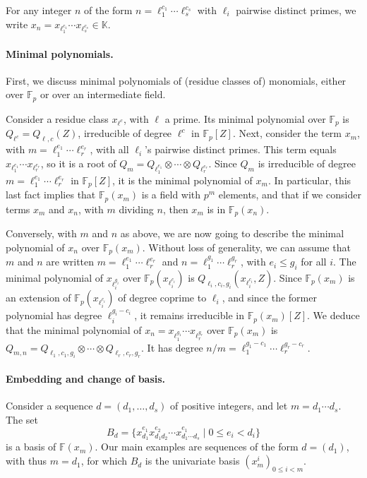 \documentclass[12pt]{article}
\def\F {\ensuremath{\mathbb{F}}}
\def\K {\ensuremath{\mathbb{K}}}
\begin{document}
For any integer $n$ of the form $n=\ell_1^{c_1}\cdots \ell_s^{c_s}$
with $\ell_i$ pairwise distinct primes, we write $x_n =
x_{\ell_1^{c_1}} \cdots x_{\ell_s^{c_s}} \in \K$.



\paragraph{Minimal polynomials.}
First, we discuss minimal polynomials of (residue classes of)
monomials, either over $\F_p$ or over an intermediate field.

Consider a residue class $x_{\ell^{c}}$, with $\ell$ a prime. Its
minimal polynomial over $\F_p$ is $Q_{\ell^c}=Q_{\ell,c}(Z)$,
irreducible of degree $\ell^{c}$ in $\F_p[Z]$. Next, consider the term
$x_m$, with $m=\ell_1^{e_1}\cdots \ell_r^{e_r}$, with all $\ell_i$'s
pairwise distinct primes. This term equals $x_{\ell_1^{e_1}} \cdots
x_{\ell_r^{e_r}}$, so it is a root of $Q_{m}=Q_{\ell_1^{e_1}} \otimes
\cdots \otimes Q_{\ell_r^{e_r}}.$ Since $Q_m$ is irreducible of degree
$m=\ell_1^{e_1}\cdots \ell_r^{e_r}$ in $\F_p[Z]$, it is the minimal
polynomial of $x_m$.  In particular, this last fact implies that
$\F_p(x_m)$ is a field with $p^m$ elements, and that if we consider
terms $x_m$ and $x_n$, with $m$ dividing $n$, then $x_m$ is in
$\F_p(x_n)$.

Conversely, with $m$ and $n$ as above, we are now going to describe
the minimal polynomial of $x_n$ over $\F_p(x_m)$. Without loss of
generality, we can assume that $m$ and $n$ are written
$m=\ell_1^{e_1}\cdots \ell_r^{e_r}$ and
$n=\ell_1^{g_1}\cdots\ell_r^{g_r}$, with $e_i \le g_i$ for all $i$.
The minimal polynomial of $x_{\ell_i^{g_i}}$ over
$\F_p(x_{\ell_i^{c_i}})$ is $Q_{\ell_i,c_i,g_i}(x_{\ell_i^{c_i}},Z)$.
Since $\F_p(x_m)$ is an extension of $\F_p(x_{\ell_i^{c_i}})$ of
degree coprime to $\ell_i$, and since the former polynomial has degree
$\ell_i^{g_i-c_i}$, it remains irreducible in $\F_p(x_m)[Z]$. We
deduce that the minimal polynomial of $x_n = x_{\ell_1^{g_1}}\cdots
x_{\ell_r^{g_r}}$ over $\F_p(x_m)$ is $Q_{m,n}=Q_{\ell_1,c_1,g_i}
\otimes \cdots \otimes Q_{\ell_r,c_r,g_r}.$ It has degree
$n/m=\ell_1^{g_1-c_1}\cdots \ell_r^{g_r-c_r}$.

\paragraph{Embedding and change of basis.} Consider a sequence $d=(d_1,\dots,d_s)$ 
of positive integers, and let $m=d_1 \cdots d_s$. The set
$$B_d = \{ x_{d_1}^{e_1} x_{d_1 d_2}^{e_2} \cdots x_{d_1 \cdots
  d_s}^{e_1} \mid 0 \le e_i < d_i \}$$ is a basis of $\F(x_m)$. Our
main examples are sequences of the form $d=(d_1)$, with thus $m=d_1$,
for which $B_d$ is the univariate basis $(x_m^i)_{0 \le i < m}$.
\end{document}
